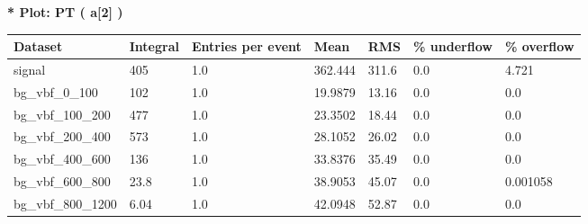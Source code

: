 \documentclass[a4paper, 10pt]{article}
\begin{document}
\textbf{* Plot: PT ( a[2] ) }\\
   \begin{table}[H]
  \begin{center}
    \begin{tabular}{|m{23.0mm}|m{23.0mm}|m{18.0mm}|m{19.0mm}|m{19.0mm}|m{19.0mm}|m{19.0mm}|}
      \hline
      {\cellcolor{yellow}         Dataset}& {\cellcolor{yellow}         Integral}& {\cellcolor{yellow}         Entries per event}& {\cellcolor{yellow}         Mean}& {\cellcolor{yellow}         RMS}& {\cellcolor{yellow}         \% underflow}& {\cellcolor{yellow}         \% overflow}\\
      \hline
      {\cellcolor{white}         signal}& {\cellcolor{white}         405}& {\cellcolor{white}         1.0}& {\cellcolor{white}         362.444}& {\cellcolor{white}         311.6}& {\cellcolor{green}         0.0}& {\cellcolor{green}         4.721}\\
      \hline
      {\cellcolor{white}         bg\_vbf\_0\_100}& {\cellcolor{white}         102}& {\cellcolor{white}         1.0}& {\cellcolor{white}         19.9879}& {\cellcolor{white}         13.16}& {\cellcolor{green}         0.0}& {\cellcolor{green}         0.0}\\
      \hline
      {\cellcolor{white}         bg\_vbf\_100\_200}& {\cellcolor{white}         477}& {\cellcolor{white}         1.0}& {\cellcolor{white}         23.3502}& {\cellcolor{white}         18.44}& {\cellcolor{green}         0.0}& {\cellcolor{green}         0.0}\\
      \hline
      {\cellcolor{white}         bg\_vbf\_200\_400}& {\cellcolor{white}         573}& {\cellcolor{white}         1.0}& {\cellcolor{white}         28.1052}& {\cellcolor{white}         26.02}& {\cellcolor{green}         0.0}& {\cellcolor{green}         0.0}\\
      \hline
      {\cellcolor{white}         bg\_vbf\_400\_600}& {\cellcolor{white}         136}& {\cellcolor{white}         1.0}& {\cellcolor{white}         33.8376}& {\cellcolor{white}         35.49}& {\cellcolor{green}         0.0}& {\cellcolor{green}         0.0}\\
      \hline
      {\cellcolor{white}         bg\_vbf\_600\_800}& {\cellcolor{white}         23.8}& {\cellcolor{white}         1.0}& {\cellcolor{white}         38.9053}& {\cellcolor{white}         45.07}& {\cellcolor{green}         0.0}& {\cellcolor{green}         0.001058}\\
      \hline
      {\cellcolor{white}         bg\_vbf\_800\_1200}& {\cellcolor{white}         6.04}& {\cellcolor{white}         1.0}& {\cellcolor{white}         42.0948}& {\cellcolor{white}         52.87}& {\cellcolor{green}         0.0}& {\cellcolor{green}         0.0}\\

\end{tabular}
\end{center}
\end{table}
\end{document}
